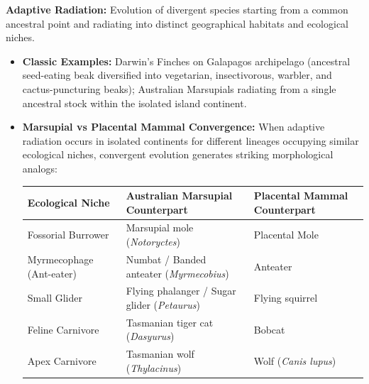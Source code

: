 \documentclass[10pt,a4paper]{article}
\begin{document}
\begin{conceptbox}
\textbf{Adaptive Radiation:} Evolution of divergent species starting from a common ancestral point and radiating into distinct geographical habitats and ecological niches.
\begin{itemize}[leftmargin=*]
  \item \textbf{Classic Examples:} Darwin's Finches on Galapagos archipelago (ancestral seed-eating beak diversified into vegetarian, insectivorous, warbler, and cactus-puncturing beaks); Australian Marsupials radiating from a single ancestral stock within the isolated island continent.
  \item \textbf{Marsupial vs Placental Mammal Convergence:} When adaptive radiation occurs in isolated continents for different lineages occupying similar ecological niches, convergent evolution generates striking morphological analogs:
  \begin{center}
  \scriptsize
  \begin{tabular}{|l|l|l|}
  \hline
  \textbf{Ecological Niche} & \textbf{Australian Marsupial Counterpart} & \textbf{Placental Mammal Counterpart} \\
  \hline
  Fossorial Burrower & Marsupial mole (\textit{Notoryctes}) & Placental Mole \\
  Myrmecophage (Ant-eater) & Numbat / Banded anteater (\textit{Myrmecobius}) & Anteater \\
  Small Glider & Flying phalanger / Sugar glider (\textit{Petaurus}) & Flying squirrel \\
  Feline Carnivore & Tasmanian tiger cat (\textit{Dasyurus}) & Bobcat \\
  Apex Carnivore & Tasmanian wolf (\textit{Thylacinus}) & Wolf (\textit{Canis lupus}) \\
  \hline
  \end{tabular}
  \end{center}
\end{itemize}
\end{conceptbox}
\end{document}
